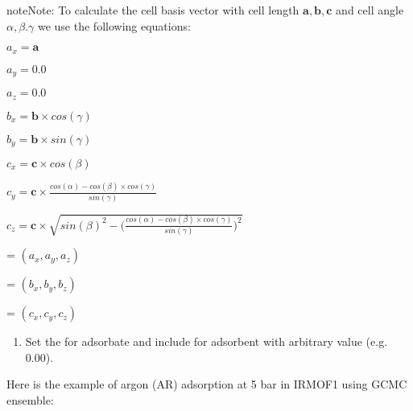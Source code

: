 \documentclass[letterpaper,10pt,english]{sphinxmanual}
\begin{document}
\begin{sphinxadmonition}{note}{Note:}
\sphinxAtStartPar
To calculate the cell basis vector with cell length \(\boldsymbol{a} , \boldsymbol{b}, \boldsymbol{c}\) and cell angle
\(\alpha, \beta. \gamma\) we use the following equations:

\sphinxAtStartPar
\(a_x = \boldsymbol{a}\)

\sphinxAtStartPar
\(a_y = 0.0\)

\sphinxAtStartPar
\(a_z = 0.0\)

\sphinxAtStartPar
\(b_x = \boldsymbol{b} \times cos(\gamma)\)

\sphinxAtStartPar
\(b_y = \boldsymbol{b} \times sin(\gamma)\)

\sphinxAtStartPar
\(c_x = \boldsymbol{c} \times cos(\beta)\)

\sphinxAtStartPar
\(c_y = \boldsymbol{c} \times \frac{ cos(\alpha) - cos(\beta) \times cos(\gamma) } { sin(\gamma) }\)

\sphinxAtStartPar
\(c_z = \boldsymbol{c} \times \sqrt {{sin(\beta)}^2 - { \bigg(\frac{ cos(\alpha) - cos(\beta) \times cos(\gamma) } { sin(\gamma) }} \bigg)^2}\)

\sphinxAtStartPar
{} = \((a_x , a_y, a_z)\)

\sphinxAtStartPar
{} = \((b_x , b_y, b_z)\)

\sphinxAtStartPar
{} = \((c_x , c_y, c_z)\)
\end{sphinxadmonition}
\begin{enumerate}
%
\setcounter{enumi}{3}
\item {} 
\sphinxAtStartPar
Set the  for adsorbate and include  for adsorbent with arbitrary value (e.g. 0.00).

\end{enumerate}

\sphinxAtStartPar
Here is the example of argon (AR) adsorption at 5 bar in IRMOF\sphinxhyphen{}1 using GCMC ensemble:
\end{document}
